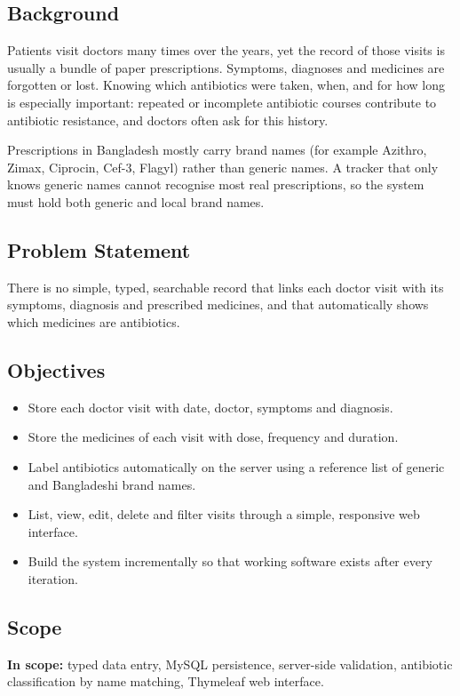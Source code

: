 \documentclass[11pt,a4paper]{article}
\begin{document}
\subsection{Background}
Patients visit doctors many times over the years, yet the record of those visits is usually a bundle of paper prescriptions. Symptoms, diagnoses and medicines are forgotten or lost. Knowing which antibiotics were taken, when, and for how long is especially important: repeated or incomplete antibiotic courses contribute to antibiotic resistance, and doctors often ask for this history.

Prescriptions in Bangladesh mostly carry brand names (for example Azithro, Zimax, Ciprocin, Cef-3, Flagyl) rather than generic names. A tracker that only knows generic names cannot recognise most real prescriptions, so the system must hold both generic and local brand names.

\subsection{Problem Statement}
There is no simple, typed, searchable record that links each doctor visit with its symptoms, diagnosis and prescribed medicines, and that automatically shows which medicines are antibiotics.

\subsection{Objectives}
\begin{itemize}
  \item Store each doctor visit with date, doctor, symptoms and diagnosis.
  \item Store the medicines of each visit with dose, frequency and duration.
  \item Label antibiotics automatically on the server using a reference list of generic and Bangladeshi brand names.
  \item List, view, edit, delete and filter visits through a simple, responsive web interface.
  \item Build the system incrementally so that working software exists after every iteration.
\end{itemize}

\subsection{Scope}
\textbf{In scope:} typed data entry, MySQL persistence, server-side validation, antibiotic classification by name matching, Thymeleaf web interface.
\end{document}
